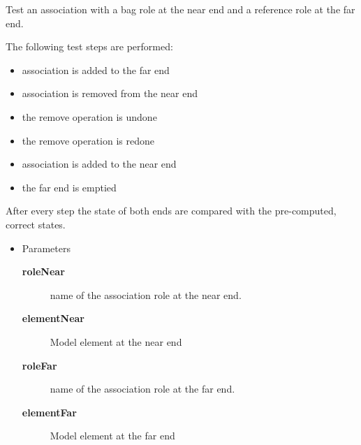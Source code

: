 \begin{desc}Test an association with a bag role at the near end and a reference role
 at the far end.

 The following test steps are performed:
 \begin{itemize}

   \item{   association is added to the far end
   }
\item{   association is removed from the near end
   }
\item{   the remove operation is undone
   }
\item{   the remove operation is redone
   }
\item{   association is added to the near end
   }
\item{   the far end is emptied
 }
\end{itemize}


 After every step the state of both ends are compared with
 the pre-computed, correct states.
\begin{itemize}
\item{Parameters
  \begin{description}
   \item[{\bf roleNear}]{name of the association role at the near end.}
   \item[{\bf elementNear}]{Model element at the near end}
   \item[{\bf roleFar}]{name of the association role at the far end.}
   \item[{\bf elementFar}]{Model element at the far end}
  \end{description}}
\end{itemize}
\end{desc}

